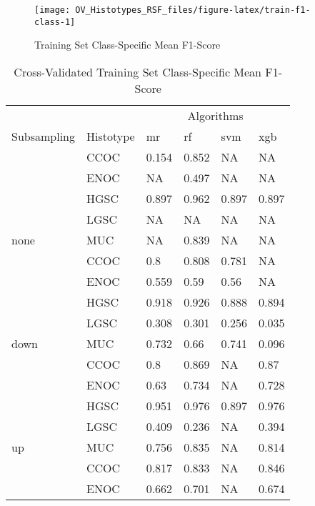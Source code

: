 \documentclass[
]{report}
\begin{document}
\begin{figure}[H]

{\centering \texttt{[image: OV\_Histotypes\_RSF\_files/figure-latex/train-f1-class-1]} 

}

\caption{Training Set Class-Specific Mean F1-Score}\label{fig:train-f1-class}
\end{figure}

\begin{table}

\caption{\label{tab:train-f1-class-table}Cross-Validated Training Set Class-Specific Mean F1-Score}
\centering
\begin{tabular}[t]{l|l|l|l|l|l}
\hline
\multicolumn{2}{c|}{ } & \multicolumn{4}{c}{Algorithms} \\
\cline{3-6}
Subsampling & Histotype & mr & rf & svm & xgb\\
\hline
 & CCOC & 0.154 & 0.852 & NA & NA\\
\cline{2-6}
 & ENOC & NA & 0.497 & NA & NA\\
\cline{2-6}
 & HGSC & 0.897 & 0.962 & 0.897 & 0.897\\
\cline{2-6}
 & LGSC & NA & NA & NA & NA\\
\cline{2-6}
\multirow{-5}{*}{\raggedright\arraybackslash none} & MUC & NA & 0.839 & NA & NA\\
\cline{1-6}
 & CCOC & 0.8 & 0.808 & 0.781 & NA\\
\cline{2-6}
 & ENOC & 0.559 & 0.59 & 0.56 & NA\\
\cline{2-6}
 & HGSC & 0.918 & 0.926 & 0.888 & 0.894\\
\cline{2-6}
 & LGSC & 0.308 & 0.301 & 0.256 & 0.035\\
\cline{2-6}
\multirow{-5}{*}{\raggedright\arraybackslash down} & MUC & 0.732 & 0.66 & 0.741 & 0.096\\
\cline{1-6}
 & CCOC & 0.8 & 0.869 & NA & 0.87\\
\cline{2-6}
 & ENOC & 0.63 & 0.734 & NA & 0.728\\
\cline{2-6}
 & HGSC & 0.951 & 0.976 & 0.897 & 0.976\\
\cline{2-6}
 & LGSC & 0.409 & 0.236 & NA & 0.394\\
\cline{2-6}
\multirow{-5}{*}{\raggedright\arraybackslash up} & MUC & 0.756 & 0.835 & NA & 0.814\\
\cline{1-6}
 & CCOC & 0.817 & 0.833 & NA & 0.846\\
\cline{2-6}
 & ENOC & 0.662 & 0.701 & NA & 0.674\\
\cline{2-6}

\end{tabular}
\end{table}
\end{document}
